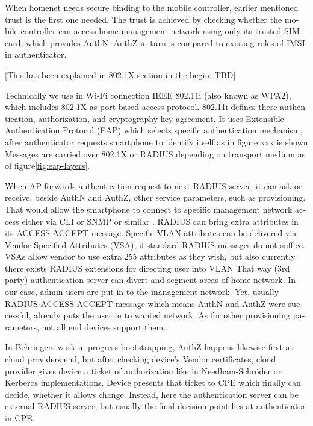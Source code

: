 \documentclass[12pt,a4paper,english]{tutthesis}
\begin{document}
\begin{otherlanguage}{english}
When homenet needs secure binding to the mobile controller, earlier
mentioned trust is the first one needed.  The trust is achieved by
checking whether the mobile controller can access home management
network using only its trusted SIM-card, which provides AuthN. AuthZ in
turn is compared to existing roles of IMSI in authenticator.


[This has been explained in 802.1X section in the begin. TBD]

Technically we use in Wi-Fi connection IEEE 802.11i (also known as WPA2), which includes
802.1X as port based access protocol.  802.11i defines there
authentication, authorization, and cryptography key agreement.
 It uses 
Extensible Authentication Protocol (EAP) which selects specific
authentication mechanism\cite[p.3]{rfc5247}, after authenticator
requests smartphone to identify itself as in figure xxx is shown
Messages are carried over 802.1X or RADIUS depending on transport
medium as of figure\ref{fig:eap-layers}.


When AP forwards authentication request to next RADIUS server, it can
ask or receive, beside AuthN and AuthZ, other service parameters, such
as provisioning. That would allow the smartphone to connect to
specific management network access either via CLI or SNMP or similar
\cite[p.4]{rfc5608}.  RADIUS can bring extra attributes in its
ACCESS-ACCEPT message.  Specific VLAN attributes can be delivered via
Vendor Specified Attributes (VSA),
if standard RADIUS messages do not suffice.  VSAs allow vendor to use
extra 255 attributes as they wish, but also currently
there exists RADIUS extensions for directing user into VLAN 
That way (3rd party) authentication server can divert and
segment areas of home network. In our case, admin users are put in to
the management network.
  Yet, usually RADIUS ACCESS-ACCEPT message which means AuthN and
AuthZ were successful, already puts the user in to wanted network. As
for other provisioning parameters, not all end devices support them.






In Behringers work-in-progress  bootstrapping\cite{draft-behringer-bootstrap},
AuthZ happens likewise first at cloud providers
end, but after checking device's Vendor certificates, cloud provider
gives device a ticket of authorization like in Needham-Schröder or
Kerberos implementations. Device presents that ticket to CPE which
finally can decide, whether it allows change. 
Instead, here the authentication server can be external RADIUS server,
but usually the final decision point lies at authenticator in CPE.



\end{otherlanguage}
\end{document}
